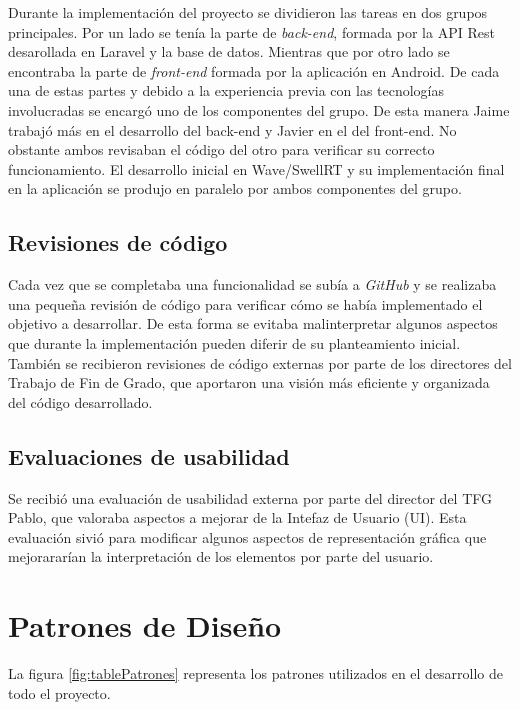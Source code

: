 Durante la implementación del proyecto se dividieron las tareas en dos grupos principales. Por un lado se tenía la parte de \textit{back-end}, formada por la API Rest desarollada en Laravel y la base de datos. Mientras que por otro lado se encontraba la parte de \textit{front-end} formada por la aplicación en Android. De cada una de estas partes y debido a la experiencia previa con las tecnologías involucradas se encargó uno de los componentes del grupo. De esta manera Jaime trabajó más en el desarrollo del back-end y Javier en el del front-end. No obstante ambos revisaban el código del otro para verificar su correcto funcionamiento. El desarrollo inicial en Wave/SwellRT y su implementación final en la aplicación se produjo en paralelo por ambos componentes del grupo.

\subsection{Revisiones de código}

Cada vez que se completaba una funcionalidad se subía a \textit{GitHub} y se realizaba una pequeña revisión de código para verificar cómo se había implementado el objetivo a desarrollar. De esta forma se evitaba malinterpretar algunos aspectos que durante la implementación pueden diferir de su planteamiento inicial. También se recibieron revisiones de código externas por parte de los directores del Trabajo de Fin de Grado, que aportaron una visión más eficiente y organizada del código desarrollado.


\subsection{Evaluaciones de usabilidad}

Se recibió una evaluación de usabilidad externa por parte del director del TFG Pablo, que valoraba aspectos a mejorar de la Intefaz de Usuario (UI). Esta evaluación sivió para modificar algunos aspectos de representación gráfica que mejorararían la interpretación de los elementos por parte del usuario.

\section{Patrones de Diseño}

La figura \ref{fig:tablePatrones} representa los patrones utilizados en el desarrollo de todo el proyecto.

